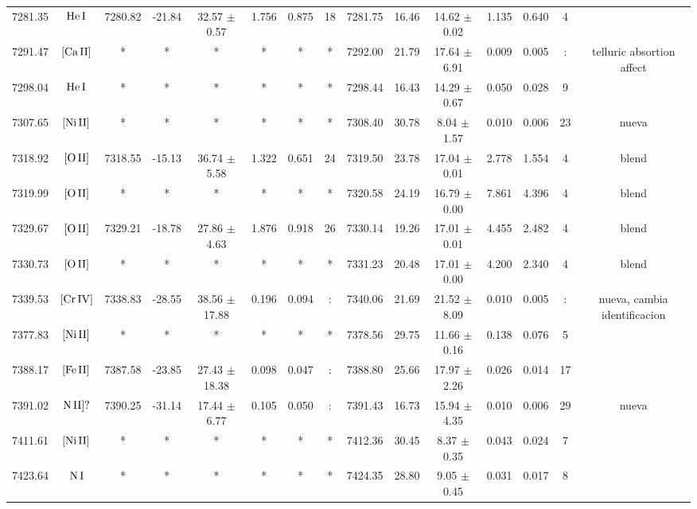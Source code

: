 \documentclass{article}
\begin{document}
\begin{table*}
\begin{adjustbox}{width=\textwidth}
\begin{tabular}{ccccccccccccccc}
7281.35 & $\mbox{He}\thinspace \mbox{I}$ & 7280.82 & -21.84 & 32.57 $\pm$ 0.57 & 1.756 & 0.875 & 18 & 7281.75 & 16.46 & 14.62 $\pm$ 0.02 & 1.135 & 0.640 & 4 &  \\
7291.47 & $\mbox{[Ca}\thinspace \mbox{II]}$ & * & * & * & * & * & * & 7292.00 & 21.79 & 17.64 $\pm$ 6.91 & 0.009 & 0.005 & : &  telluric absortion affect \\
7298.04 & $\mbox{He}\thinspace \mbox{I}$ & * & * & * & * & * & * & 7298.44 & 16.43 & 14.29 $\pm$ 0.67 & 0.050 & 0.028 & 9 &  \\
7307.65 & $\mbox{[Ni}\thinspace \mbox{II]}$ & * & * & * & * & * & * & 7308.40 & 30.78 & 8.04 $\pm$ 1.57 & 0.010 & 0.006 & 23 &  nueva \\
7318.92 & $\mbox{[O}\thinspace \mbox{II]}$ & 7318.55 & -15.13 & 36.74 $\pm$ 5.58 & 1.322 & 0.651 & 24 & 7319.50 & 23.78 & 17.04 $\pm$ 0.01 & 2.778 & 1.554 & 4 &  blend \\
7319.99 & $\mbox{[O}\thinspace \mbox{II]}$ & * & * & * & * & * & * & 7320.58 & 24.19 & 16.79 $\pm$ 0.00 & 7.861 & 4.396 & 4 &  blend \\
7329.67 & $\mbox{[O}\thinspace \mbox{II]}$ & 7329.21 & -18.78 & 27.86 $\pm$ 4.63 & 1.876 & 0.918 & 26 & 7330.14 & 19.26 & 17.01 $\pm$ 0.01 & 4.455 & 2.482 & 4 &  blend \\
7330.73 & $\mbox{[O}\thinspace \mbox{II]}$ & * & * & * & * & * & * & 7331.23 & 20.48 & 17.01 $\pm$ 0.00 & 4.200 & 2.340 & 4 &  blend \\
7339.53 & $\mbox{[Cr}\thinspace \mbox{IV]}$ & 7338.83 & -28.55 & 38.56 $\pm$ 17.88 & 0.196 & 0.094 & : & 7340.06 & 21.69 & 21.52 $\pm$ 8.09 & 0.010 & 0.005 & : &  nueva, cambia identificacion \\
7377.83 & $\mbox{[Ni}\thinspace \mbox{II]}$ & * & * & * & * & * & * & 7378.56 & 29.75 & 11.66 $\pm$ 0.16 & 0.138 & 0.076 & 5 &  \\
7388.17 & $\mbox{[Fe}\thinspace \mbox{II]}$ & 7387.58 & -23.85 & 27.43 $\pm$ 18.38 & 0.098 & 0.047 & : & 7388.80 & 25.66 & 17.97 $\pm$ 2.26 & 0.026 & 0.014 & 17 &  \\
7391.02 & $\mbox{N}\thinspace \mbox{II]?}$ & 7390.25 & -31.14 & 17.44 $\pm$ 6.77 & 0.105 & 0.050 & : & 7391.43 & 16.73 & 15.94 $\pm$ 4.35 & 0.010 & 0.006 & 29 &  nueva \\
7411.61 & $\mbox{[Ni}\thinspace \mbox{II]}$ & * & * & * & * & * & * & 7412.36 & 30.45 & 8.37 $\pm$ 0.35 & 0.043 & 0.024 & 7 &  \\
7423.64 & $\mbox{N}\thinspace \mbox{I}$ & * & * & * & * & * & * & 7424.35 & 28.80 & 9.05 $\pm$ 0.45 & 0.031 & 0.017 & 8 &  \\

\end{tabular}
\end{adjustbox}
\end{table*}
\end{document}
